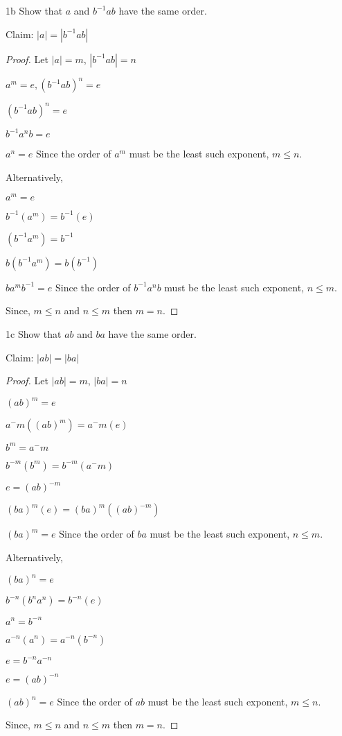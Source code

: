 \begin{question}{1b} Show that $a$ and $b^{-1}ab$ have the same order.

Claim: $|a| = |b^{-1}ab|$
\begin{proof}
Let $|a|=m$, $|b^{-1}ab|=n$

$a^m = e, (b^{-1}ab)^n = e$

$(b^{-1}ab)^n = e$

$b^{-1}a^nb = e$

$a^n = e$ Since the order of $a^m$ must be the least such exponent, $m \leq n$.


Alternatively, 

$a^m = e$

$b^{-1}(a^m) = b^{-1}(e)$

$(b^{-1}a^m) = b^{-1}$

$b(b^{-1}a^m) = b(b^{-1})$

$ba^mb^{-1} = e$ Since the order of $b^{-1}a^nb$ must be the least such exponent, $n \leq m$.

Since, $m \leq n$ and $n \leq m$ then $m = n$.
\end{proof}
\end{question}

\begin{question}{1c} Show that $ab$ and $ba$ have the same order.

Claim: $|ab| = |ba|$
\begin{proof}
Let $|ab|=m$, $|ba|=n$

$(ab)^m = e$

$a^-m((ab)^m) = a^-m(e)$

$b^m = a^-m$

$b^{-m}(b^m) = b^{-m}(a^-m)$

$e = (ab)^{-m}$

$(ba)^m(e) = (ba)^m((ab)^{-m})$

$(ba)^m = e$ Since the order of $ba$ must be the least such exponent, $n \leq m$.

Alternatively,

$(ba)^n = e$

$b^{-n}(b^na^n) = b^{-n}(e)$

$a^n = b^{-n}$

$a^{-n}(a^n) = a^{-n}(b^{-n})$

$e = b^{-n}a^{-n}$

$e = (ab)^{-n}$

$(ab)^n = e$ Since the order of $ab$ must be the least such exponent, $m \leq n$.

Since, $m \leq n$ and $n \leq m$ then $m = n$.
\end{proof}
\end{question}

